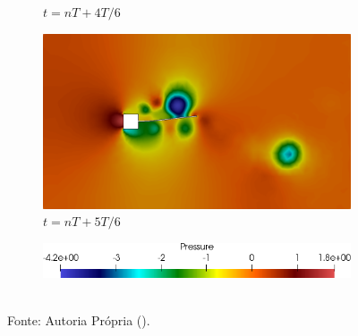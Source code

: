 \begin{figure}[h!]
\begin{subfigure}[b]{0.49\textwidth}
        \caption{$t=nT+4T/6$}
    \end{subfigure}
    \begin{subfigure}[b]{0.49\textwidth}
        \includegraphics[width=\linewidth]{Figuras/FSI-prism2/pT6.png}
        \caption{$t=nT+5T/6$}
    \end{subfigure}
    \begin{subfigure}[b]{0.49\textwidth}
        \includegraphics[width=\linewidth]{Figuras/FSI-prism2/pLegenda.png}
    \end{subfigure}
    \\Fonte: Autoria Própria (\the\year).
    \label{fig:prismPres2}
\end{figure}

